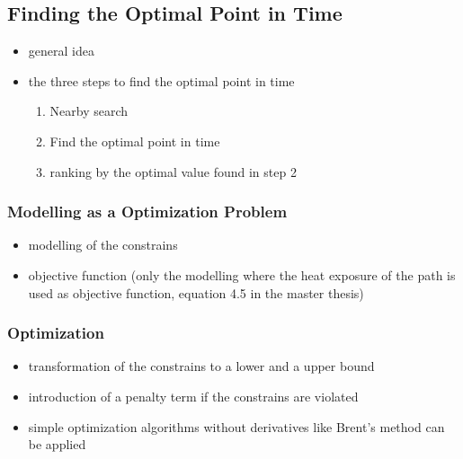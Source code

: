  \subsection{Finding the Optimal Point in Time}
 
 \begin{itemize}
 	\item general idea
 	\item the three steps to find the optimal point in time
 		\begin{enumerate}
 			\item Nearby search
 			\item Find the optimal point in time
 			\item ranking by the optimal value found in step 2
 		\end{enumerate}
 \end{itemize}
 
 \subsubsection{Modelling as a Optimization Problem}
 
 \begin{itemize}
 	\item modelling of the constrains
 	\item objective function (only the modelling where the heat exposure of the path is used as objective function, equation 4.5 in the master thesis)
 \end{itemize}

 \subsubsection{Optimization}
 
 \begin{itemize}
 	\item transformation of the constrains to a lower and a upper bound
 	\item introduction of a penalty term if the constrains are violated
 	\item simple optimization algorithms without derivatives like Brent's method can be applied   
 \end{itemize}